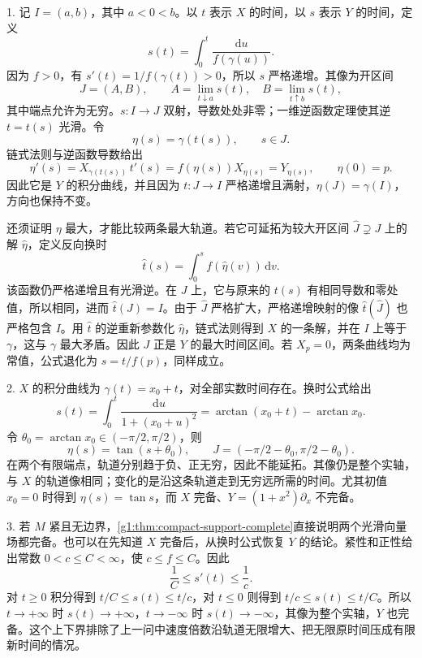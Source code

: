 \begin{solution}
	1. 记 \(I=(a,b)\)，其中 \(a<0<b\)。以 \(t\) 表示 \(X\) 的时间，以 \(s\) 表示 \(Y\) 的时间，定义
	\[
		s(t)=\int_0^t\frac{\mathrm{d}u}{f(\gamma(u))}.
	\]
	因为 \(f>0\)，有 \(s'(t)=1/f(\gamma(t))>0\)，所以 \(s\) 严格递增。其像为开区间
	\[
		J=(A,B),\qquad
		A=\lim_{t\downarrow a}s(t),\quad B=\lim_{t\uparrow b}s(t),
	\]
	其中端点允许为无穷。\(s:I\to J\) 双射，导数处处非零；一维逆函数定理使其逆 \(t=t(s)\) 光滑。令
	\[
		\eta(s)=\gamma(t(s)),\qquad s\in J.
	\]
	链式法则与逆函数导数给出
	\[
		\eta'(s)=X_{\gamma(t(s))}\,t'(s)
		=f(\eta(s))X_{\eta(s)}=Y_{\eta(s)},\qquad \eta(0)=p.
	\]
	因此它是 \(Y\) 的积分曲线，并且因为 \(t:J\to I\) 严格递增且满射，\(\eta(J)=\gamma(I)\)，方向也保持不变。

	还须证明 \(\eta\) 最大，才能比较两条最大轨道。若它可延拓为较大开区间 \(\widehat J\supsetneq J\) 上的解 \(\widehat\eta\)，定义反向换时
	\[
		\widehat t(s)=\int_0^s f(\widehat\eta(v))\,\mathrm{d}v.
	\]
	该函数仍严格递增且有光滑逆。在 \(J\) 上，它与原来的 \(t(s)\) 有相同导数和零处值，所以相同，进而 \(\widehat t(J)=I\)。由于 \(\widehat J\) 严格扩大，严格递增映射的像 \(\widehat t(\widehat J)\) 也严格包含 \(I\)。用 \(\widehat t\) 的逆重新参数化 \(\widehat\eta\)，链式法则得到 \(X\) 的一条解，并在 \(I\) 上等于 \(\gamma\)，这与 \(\gamma\) 最大矛盾。因此 \(J\) 正是 \(Y\) 的最大时间区间。若 \(X_p=0\)，两条曲线均为常值，公式退化为 \(s=t/f(p)\)，同样成立。

	2. \(X\) 的积分曲线为 \(\gamma(t)=x_0+t\)，对全部实数时间存在。换时公式给出
	\[
		s(t)=\int_0^t\frac{\mathrm{d}u}{1+(x_0+u)^2}
		=\arctan(x_0+t)-\arctan x_0.
	\]
	令 \(\theta_0=\arctan x_0\in(-\pi/2,\pi/2)\)，则
	\[
		\eta(s)=\tan(s+\theta_0),\qquad
		J=(-\pi/2-\theta_0,\pi/2-\theta_0).
	\]
	在两个有限端点，轨道分别趋于负、正无穷，因此不能延拓。其像仍是整个实轴，与 \(X\) 的轨道像相同；变化的是沿这条轨道走到无穷远所需的时间。尤其初值 \(x_0=0\) 时得到 \(\eta(s)=\tan s\)，而 \(X\) 完备、\(Y=(1+x^2)\partial_x\) 不完备。

	3. 若 \(M\) 紧且无边界，\cref{g1:thm:compact-support-complete}直接说明两个光滑向量场都完备。也可以在先知道 \(X\) 完备后，从换时公式恢复 \(Y\) 的结论。紧性和正性给出常数 \(0<c\leq C<\infty\)，使 \(c\leq f\leq C\)。因此
	\[
		\frac1C\leq s'(t)\leq\frac1c.
	\]
	对 \(t\geq0\) 积分得到 \(t/C\leq s(t)\leq t/c\)，对 \(t\leq0\) 则得到 \(t/c\leq s(t)\leq t/C\)。所以 \(t\to+\infty\) 时 \(s(t)\to+\infty\)，\(t\to-\infty\) 时 \(s(t)\to-\infty\)，其像为整个实轴，\(Y\) 也完备。这个上下界排除了上一问中速度倍数沿轨道无限增大、把无限原时间压成有限新时间的情况。
\end{solution}

